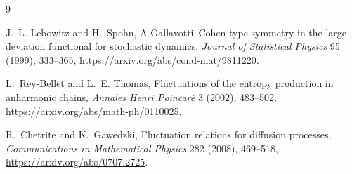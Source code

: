 \documentclass[11pt]{article}
\theoremstyle{remark}
\begin{document}
\begin{thebibliography}{9}

J.~L. Lebowitz and H.~Spohn,
\newblock A Gallavotti--Cohen-type symmetry in the large deviation functional
for stochastic dynamics,
\newblock \emph{Journal of Statistical Physics} 95 (1999), 333--365,
\newblock \url{https://arxiv.org/abs/cond-mat/9811220}.

L.~Rey-Bellet and L.~E. Thomas,
\newblock Fluctuations of the entropy production in anharmonic chains,
\newblock \emph{Annales Henri Poincar\'e} 3 (2002), 483--502,
\newblock \url{https://arxiv.org/abs/math-ph/0110025}.

R.~Chetrite and K.~Gawedzki,
\newblock Fluctuation relations for diffusion processes,
\newblock \emph{Communications in Mathematical Physics} 282 (2008), 469--518,
\newblock \url{https://arxiv.org/abs/0707.2725}.

\end{thebibliography}
\end{document}
